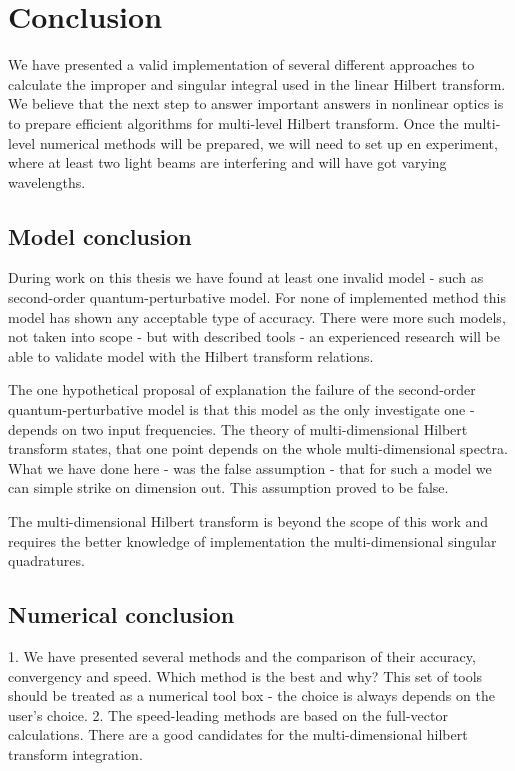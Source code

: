 \documentclass[12pt,twoside,a4paper]{article}
\numberwithin{equation}{subsection}
\numberwithin{figure}{subsection}
\begin{document}
\section{Conclusion} \label{chap:conclusion}

We have presented a valid implementation of several different approaches to calculate the improper and singular integral used in the linear Hilbert transform. We believe that the next step to answer important answers in nonlinear optics is to prepare efficient algorithms for multi-level Hilbert transform. Once the multi-level numerical methods will be prepared, we will need to set up en experiment, where at least two light beams are interfering and will have got varying wavelengths.

\subsection{Model conclusion} \label{chap:conclusion_model}


During work on this thesis we have found at least one invalid model - such as second-order quantum-perturbative model. For none of implemented method this model has shown any acceptable type of accuracy. There were more such models, not taken into scope - but with described tools - an experienced research will be able to validate model with the Hilbert transform relations.

The one hypothetical proposal of explanation the failure of the second-order quantum-perturbative model is that this model as the only investigate one - depends on two input frequencies. The theory of multi-dimensional Hilbert transform states, that one point depends on the whole multi-dimensional spectra. What we have done here - was the false assumption - that for such a model we can simple strike on dimension out. This assumption proved to be false. 

The multi-dimensional Hilbert transform is beyond the scope of this work and requires the better knowledge of implementation the multi-dimensional singular quadratures.


\subsection{Numerical conclusion} \label{chap:conclusion_numerical}


1. We have presented several methods and the comparison of their accuracy, convergency and speed. Which method is the best and why? This set of tools should be treated as a numerical tool box - the choice is always depends on the user's choice.
2. The speed-leading methods are based on the full-vector calculations. There are a good candidates for the multi-dimensional hilbert transform integration.
\end{document}
